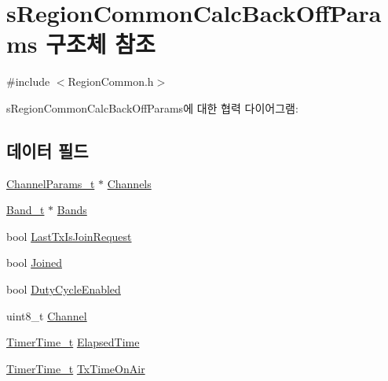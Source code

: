 \hypertarget{structs_region_common_calc_back_off_params}{}\section{s\+Region\+Common\+Calc\+Back\+Off\+Params 구조체 참조}
\label{structs_region_common_calc_back_off_params}


{\ttfamily \#include $<$Region\+Common.\+h$>$}



s\+Region\+Common\+Calc\+Back\+Off\+Params에 대한 협력 다이어그램\+:
\subsection*{데이터 필드}
\begin{DoxyCompactItemize}
\item 
\mbox{\hyperlink{group___l_o_r_a_m_a_c_ga1360ca6f82c6d125ea43a9dad9b56184}{Channel\+Params\+\_\+t}} $\ast$ \mbox{\hyperlink{structs_region_common_calc_back_off_params_afecbd1e457cbd79eb7072bd140ff33d4}{Channels}}
\item 
\mbox{\hyperlink{group___l_o_r_a_m_a_c_ga8f49721ee96ceb52c80a896ab11a2ed8}{Band\+\_\+t}} $\ast$ \mbox{\hyperlink{structs_region_common_calc_back_off_params_a18afce97f43b46e9d294e5babbb15f15}{Bands}}
\item 
bool \mbox{\hyperlink{structs_region_common_calc_back_off_params_a4088d0ca2ff21fd5cdc110e14816dd53}{Last\+Tx\+Is\+Join\+Request}}
\item 
bool \mbox{\hyperlink{structs_region_common_calc_back_off_params_ac2f6caa0f3b02d2ac5056c3ee7c22652}{Joined}}
\item 
bool \mbox{\hyperlink{structs_region_common_calc_back_off_params_a4d755868e0e80089462286c3ba6a6f18}{Duty\+Cycle\+Enabled}}
\item 
uint8\+\_\+t \mbox{\hyperlink{structs_region_common_calc_back_off_params_a1ca6f01ca18afe402de51babe8c95f5e}{Channel}}
\item 
\mbox{\hyperlink{utilities_8h_a4215ca43d3e953099ea758ce428599d0}{Timer\+Time\+\_\+t}} \mbox{\hyperlink{structs_region_common_calc_back_off_params_a2ece30988e7a5bac284623173173c71a}{Elapsed\+Time}}
\item 
\mbox{\hyperlink{utilities_8h_a4215ca43d3e953099ea758ce428599d0}{Timer\+Time\+\_\+t}} \mbox{\hyperlink{structs_region_common_calc_back_off_params_aa17a8607485db100d315e74853dd217e}{Tx\+Time\+On\+Air}}
\end{DoxyCompactItemize}



